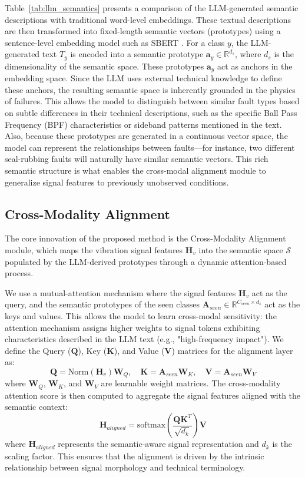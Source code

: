 Table~\ref{tab:llm_semantics} presents a comparison of the LLM-generated semantic descriptions with traditional word-level embeddings. These textual descriptions are then transformed into fixed-length semantic vectors (prototypes) using a sentence-level embedding model such as SBERT \cite{reimers2019sentence}. For a class $y$, the LLM-generated text $T_y$ is encoded into a semantic prototype $\mathbf{a}_y \in \mathbb{R}^{d_s}$, where $d_s$ is the dimensionality of the semantic space. These prototypes $\mathbf{a}_y$ act as anchors in the embedding space. Since the LLM uses external technical knowledge to define these anchors, the resulting semantic space is inherently grounded in the physics of failures. This allows the model to distinguish between similar fault types based on subtle differences in their technical descriptions, such as the specific Ball Pass Frequency (BPF) characteristics or sideband patterns mentioned in the text. Also, because these prototypes are generated in a continuous vector space, the model can represent the relationships between faults—for instance, two different seal-rubbing faults will naturally have similar semantic vectors. This rich semantic structure is what enables the cross-modal alignment module to generalize signal features to previously unobserved conditions.

\subsection{Cross-Modality Alignment}
The core innovation of the proposed method is the Cross-Modality Alignment module, which maps the vibration signal features $\mathbf{H}_v$ into the semantic space $\mathcal{S}$ populated by the LLM-derived prototypes through a dynamic attention-based process.

We use a mutual-attention mechanism where the signal features $\mathbf{H}_v$ act as the query, and the semantic prototypes of the seen classes $\mathbf{A}_{seen} \in \mathbb{R}^{C_{seen} \times d_s}$ act as the keys and values. This allows the model to learn cross-modal sensitivity: the attention mechanism assigns higher weights to signal tokens exhibiting characteristics described in the LLM text (e.g., "high-frequency impact"). We define the Query ($\mathbf{Q}$), Key ($\mathbf{K}$), and Value ($\mathbf{V}$) matrices for the alignment layer as:
\begin{equation}
\mathbf{Q} = \text{Norm}(\mathbf{H}_v) \mathbf{W}_Q, \quad \mathbf{K} = \mathbf{A}_{seen} \mathbf{W}_K, \quad \mathbf{V} = \mathbf{A}_{seen} \mathbf{W}_V
\end{equation}
where $\mathbf{W}_Q$, $\mathbf{W}_K$, and $\mathbf{W}_V$ are learnable weight matrices. The cross-modality attention score is then computed to aggregate the signal features aligned with the semantic context:
\begin{equation}
\mathbf{H}_{aligned} = \text{softmax}\left(\frac{\mathbf{Q}\mathbf{K}^T}{\sqrt{d_k}}\right) \mathbf{V}
\end{equation}
where $\mathbf{H}_{aligned}$ represents the semantic-aware signal representation and $d_k$ is the scaling factor. This ensures that the alignment is driven by the intrinsic relationship between signal morphology and technical terminology.

